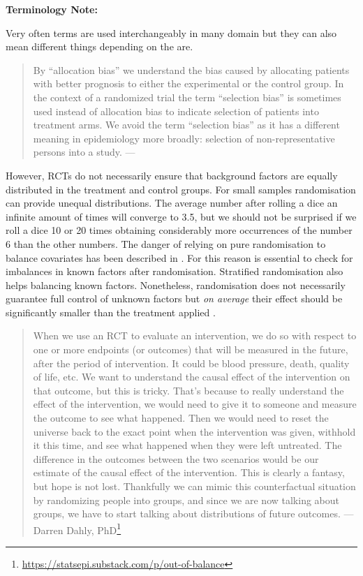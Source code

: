 \documentclass[
  12pt,
]{book}
\DeclareRobustCommand{\href}[2]{#2\footnote{\url{#1}}}
\begin{document}
\begin{tipbox}

\textbf{Terminology Note:}

Very often terms are used interchangeably in many domain but they can also mean different things depending on the are.

\begin{quote}
By ``allocation bias'' we understand the bias caused by allocating patients with better prognosis to either the experimental or the control group. In the context of a randomized trial the term ``selection bias'' is sometimes used instead of allocation bias to indicate selection of patients into treatment arms. We avoid the term ``selection bias'' as it has a different meaning in epidemiology more broadly: selection of non-representative persons into a study. --- \citep{paludan2016mechanisms}
\end{quote}

\end{tipbox}

However, RCTs do not necessarily ensure that background factors are equally distributed in the treatment and control groups. For small samples randomisation can provide unequal distributions. The average number after rolling a dice an infinite amount of times will converge to 3.5, but we should not be surprised if we roll a dice 10 or 20 times obtaining considerably more occurrences of the number 6 than the other numbers. The danger of relying on pure randomisation to balance covariates has been described in \citep{krause2003random} \citep{morgan2012rerandomization}. For this reason is essential to check for imbalances in known factors after randomisation. Stratified randomisation also helps balancing known factors. Nonetheless, randomisation does not necessarily guarantee full control of unknown factors but \emph{on average} their effect should be significantly smaller than the treatment applied \citep{deaton2018understanding}.

\begin{quote}
When we use an RCT to evaluate an intervention, we do so with respect to one or more endpoints (or outcomes) that will be measured in the future, after the period of intervention. It could be blood pressure, death, quality of life, etc. We want to understand the causal effect of the intervention on that outcome, but this is tricky. That's because to really understand the effect of the intervention, we would need to give it to someone and measure the outcome to see what happened. Then we would need to reset the universe back to the exact point when the intervention was given, withhold it this time, and see what happened when they were left untreated. The difference in the outcomes between the two scenarios would be our estimate of the causal effect of the intervention. This is clearly a fantasy, but hope is not lost. Thankfully we can mimic this counterfactual situation by randomizing people into groups, and since we are now talking about groups, we have to start talking about distributions of future outcomes. --- \href{https://statsepi.substack.com/p/out-of-balance}{Darren Dahly, PhD}
\end{quote}
\end{document}
